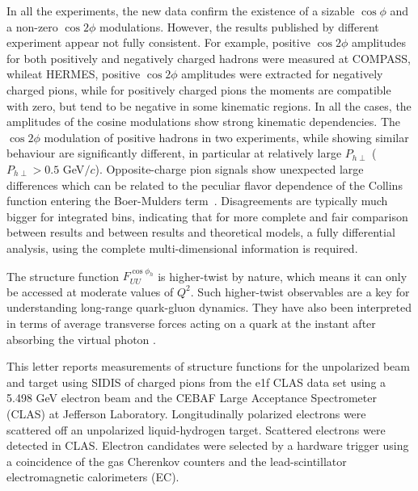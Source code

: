 \documentclass[aps,prl,twocolumn,showpacs,superscriptaddress,groupedaddress]{revtex4}  %
\newcommand{\Phperp}{P_{h\perp}}
\newcommand{\ph}{\phi_h}
\begin{document}
In all the experiments, the new data confirm the existence of a sizable
$\cos\phi$ and a non-zero $\cos2\phi$ modulations.  However, the results
published by different experiment appear not fully consistent. For example,
positive $\cos2\phi$ amplitudes for both positively and negatively charged
hadrons were measured at COMPASS, whileat HERMES, positive $\cos 2\phi$ amplitudes
were extracted for negatively charged pions, while for positively charged pions
the moments are compatible with zero, but tend to be negative in some kinematic
regions. In all the cases, the amplitudes of the cosine modulations show strong
kinematic dependencies. 
The $\cos2\phi$ modulation of positive hadrons in two experiments, while showing similar behaviour are significantly different, in particular at relatively large $\Phperp$  ($\Phperp>0.5$ GeV$/c$).
Opposite-charge pion signals show unexpected large differences which can be related to the peculiar flavor dependence of the Collins function entering the Boer-Mulders term~\cite{Airapetian:2012yg}. Disagreements are typically much bigger for integrated bins, indicating that for 
more complete and fair comparison between results and between results
and theoretical models, a fully differential analysis, using the complete
multi-dimensional information is required.
 

The structure function $F^{\cos \ph}_{UU}$ is higher-twist by nature, which means it can only be accessed at moderate values of $Q^2$. Such higher-twist observables are a key for understanding
long-range quark-gluon dynamics.
They have also been interpreted in terms of 
average transverse forces acting on a quark at the instant after
absorbing the virtual photon \cite{Burkardt:2008vd}.


This letter reports measurements of structure functions for the unpolarized beam and target using SIDIS of charged pions from the e1f CLAS data set 
using a 5.498 GeV electron beam and the CEBAF Large Acceptance 
Spectro\-meter (CLAS) \cite{Mecking:2003zu} at Jefferson Laboratory.
Longitudinally polarized electrons were scattered off
an unpolarized liquid-hydrogen target. 
Scattered electrons were detected in CLAS.
Electron candidates were selected by a hardware trigger using a 
coincidence of the gas Cherenkov counters and the lead-scintillator electromagnetic calorimeters (EC). 
\end{document}
